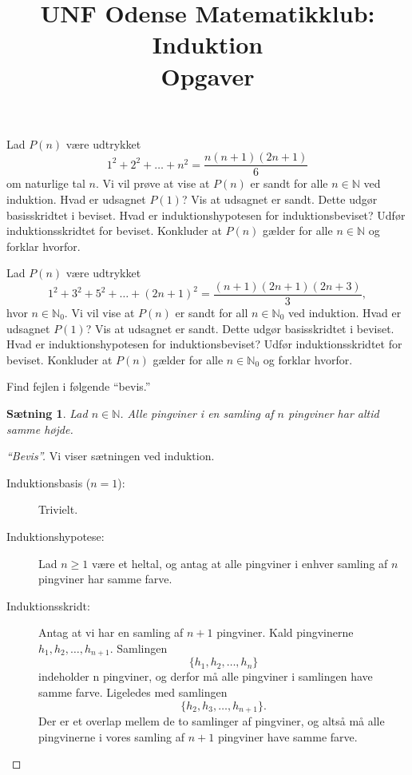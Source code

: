 \documentclass[a4paper,12pt]{article}
\title{UNF Odense Matematikklub: Induktion\\
\Large{Opgaver}}
\author{}
\date{}
\theoremstyle{plain}
\newtheorem{saetning}{Sætning}[section]
\newcommand{\N}{\mathbb{N}}
\begin{document}
\maketitle
\thispagestyle{empty}
\newpage
\setcounter{page}{1}
\begin{Exercise}[label={ex:1}]
  Lad \(P(n)\) være udtrykket
  \[
    1^2+2^2+\dots+n^2=\frac{n(n+1)(2n+1)}{6}
    \]
    om naturlige tal \(n\). Vi vil prøve at vise at \(P(n)\) er sandt for alle \(n\in\N\) ved induktion.
    \Question Hvad er udsagnet \(P(1)\)? Vis at udsagnet er sandt. Dette udgør basisskridtet i beviset.
    \Question Hvad er induktionshypotesen for induktionsbeviset?
    \Question Udfør induktionsskridtet for beviset.
    \Question Konkluder at \(P(n)\) gælder for alle \(n\in\N\) og forklar hvorfor.
\end{Exercise}
\begin{Exercise}
 Lad \(P(n)\) være udtrykket
  \[
    1^2+3^2+5^2+\dots+(2n+1)^2=\frac{(n+1)(2n+1)(2n+3)}{3},
    \]
    hvor \(n\in\N_0\). Vi vil vise at \(P(n)\) er sandt for all \(n\in\N_0\) ved induktion.
    \Question Hvad er udsagnet \(P(1)\)? Vis at udsagnet er sandt. Dette udgør basisskridtet i beviset.
    \Question Hvad er induktionshypotesen for induktionsbeviset?
    \Question Udfør induktionsskridtet for beviset.
    \Question Konkluder at \(P(n)\) gælder for alle \(n\in\N_0\) og forklar hvorfor.
\end{Exercise}
\begin{Exercise}
  Find fejlen i følgende ``bevis.''
  \begin{saetning}
    Lad \(n\in\N\). Alle pingviner i en samling af \(n\) pingviner har altid samme højde.
  \end{saetning}
  \begin{proof}[``Bevis'']
    Vi viser sætningen ved induktion.
    \begin{description}
    \item[Induktionsbasis (\(n=1\)):] Trivielt.
    \item[Induktionshypotese:] Lad \(n\ge 1\) være et heltal, og antag at alle pingviner i enhver samling af \(n\) pingviner har samme farve.
    \item[Induktionsskridt:] Antag at vi har en samling af \(n+1\) pingviner. Kald pingvinerne \(h_1,h_2,\dots,h_{n+1}\). Samlingen
      \[
        \{h_1,h_2,\ldots,h_n\}
      \]
        indeholder n pingviner, og derfor må alle pingviner i samlingen have samme farve. Ligeledes med samlingen
      \[
          \{h_2,h_3,\ldots,h_{n+1}\}.
      \]
      Der er et overlap mellem de to samlinger af pingviner, og altså må alle pingvinerne i vores samling af \(n+1\) pingviner have samme farve.
    \end{description}
  \end{proof}
\end{Exercise}
\end{document}
